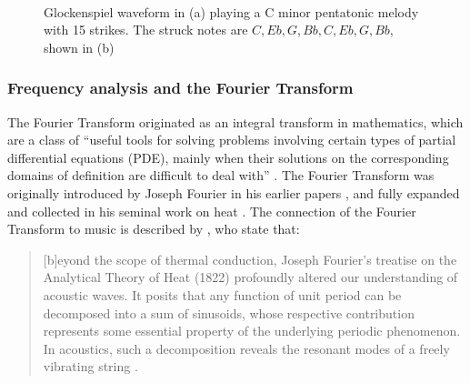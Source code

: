 \documentclass[report.tex]{subfiles}
\begin{document}
\begin{figure}[ht]
	\centering
	\\
	\caption{Glockenspiel waveform in (a) playing a C minor pentatonic melody with 15 strikes. The struck notes are $C, Eb, G, Bb, C, Eb, G, Bb$, shown in (b)}
	\label{fig:glockwaveform}
\end{figure}

\subsubsection{Frequency analysis and the Fourier Transform}
\label{sec:freqanal}

The Fourier Transform originated as an integral transform in mathematics, which are a class of ``useful tools for solving problems involving certain types of partial differential equations (PDE), mainly when their solutions on the corresponding domains of definition are difficult to deal with'' \parencite[54]{fourierhistory}. The Fourier Transform was originally introduced by Joseph Fourier in his earlier papers \parencite{fourierhist1, fourierhist2}, and fully expanded and collected in his seminal work on heat \parencite{fourierheat}. The connection of the Fourier Transform to music is described by \citeauthor{fouriermusic}, who state that:

\begin{quote}
	[b]eyond the scope of thermal conduction, Joseph Fourier's treatise on the Analytical Theory of Heat (1822) profoundly altered our understanding of acoustic waves. It posits that any function of unit period can be decomposed into a sum of sinusoids, whose respective contribution represents some essential property of the underlying periodic phenomenon. In acoustics, such a decomposition reveals the resonant modes of a freely vibrating string \parencite[461]{fouriermusic}.
\end{quote}
\end{document}
